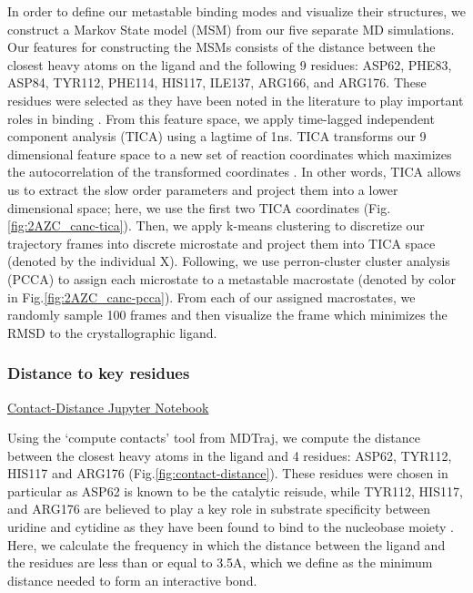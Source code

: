 \documentclass[fleqn,10pt]{wlscirep}
\begin{document}
In order to define our metastable binding modes and visualize their structures, we construct a Markov State model (MSM) \cite{} from our five separate MD simulations.
Our features for constructing the MSMs consists of the distance between the closest heavy atoms on the ligand and the following 9 residues: ASP62, PHE83, ASP84, TYR112, PHE114, HIS117, ILE137, ARG166, and ARG176.
These residues were selected as they have been noted in the literature to play important roles in binding \cite{tanaka}.
From this feature space, we apply time-lagged independent component analysis (TICA) using a lagtime of 1ns.
TICA transforms our 9 dimensional feature space to a new set of reaction coordinates which maximizes the autocorrelation of the transformed coordinates \cite{}.
In other words, TICA allows us to extract the slow order parameters and project them into a lower dimensional space; here, we use the first two TICA coordinates (Fig. \ref{fig:2AZC_canc-tica}).
Then, we apply k-means clustering to discretize our trajectory frames into discrete microstate and project them into TICA space (denoted by the individual X).
Following, we use perron-cluster cluster analysis (PCCA) \cite{} to assign each microstate to a metastable macrostate (denoted by color in Fig.\ref{fig:2AZC_canc-pcca}).
From each of our assigned macrostates, we randomly sample 100 frames and then visualize the frame which minimizes the RMSD to the crystallographic ligand.

\subsubsection{Distance to key residues}

\href{https://github.com/nathanmlim/Spitale/blob/master/manual_md/notebooks/contact-distance.ipynb}{Contact-Distance Jupyter Notebook}

Using the `compute contacts' tool from MDTraj, we compute the distance between the closest heavy atoms in the ligand and 4 residues: ASP62, TYR112, HIS117 and ARG176 (Fig.\ref{fig:contact-distance}).
These residues were chosen in particular as ASP62 is known to be the catalytic reisude, while TYR112, HIS117, and ARG176 are believed to play a key role in substrate specificity between uridine and cytidine as they have been found to bind to the nucleobase moiety \cite{tanaka}.
Here, we calculate the frequency in which the distance between the ligand and the residues are less than or equal to 3.5A, which we define as the minimum distance needed to form an interactive bond.
\end{document}
